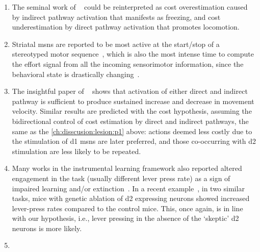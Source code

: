 \begin{enumerate}[noitemsep, label=\roman*.]
    \item \label{ch:disscusion:lesion:p1} The seminal work of \citeauthor{Kravitz2010Nature}~\cite{Kravitz2010Nature} could be reinterpreted as cost overestimation caused by indirect pathway activation that manifests as freezing, and cost underestimation by direct pathway activation that promotes locomotion.
    \item Striatal \glspl{msn} are reported to be most active at the start/stop of a stereotyped motor sequence~\cite{Barnes2005Nature, Jin2014NN}, which is also the most intense time to compute the effort signal from all the incoming sensorimotor information, since the behavioral state is drastically changing~\cite{Sales-Carbonell2018, Robbe2018}.
    \item The insightful paper of ~\cite{Yttri2016Nature} shows that activation of either direct and indirect pathway is sufficient to produce sustained increase and decrease in movement velocity.
    Similar results are predicted with the cost hypothesis, assuming the bidirectional control of cost estimation by direct and indirect pathways, the same as the \autoref{ch:disscusion:lesion:p1} above:
    actions deemed less costly due to the stimulation of \gls{d1} \glspl{msn} are later preferred, and those co-occurring with \gls{d2} stimulation are less likely to be repeated.
    \item Many works in the instrumental learning framework also reported altered engagement in the task (usually different lever press rate) as a sign of impaired learning and/or extinction~\cite[see][for example]{Hart2018CurrBiol}.
    In a recent example~\cite{Matamales2020Sci}, in two similar tasks, mice with genetic ablation of \gls{d2} expressing neurons showed increased lever-press rates compared to the control mice.
    This, once again, is in line with our hypothesis, i.e., lever pressing in the absence of the `skeptic' \gls{d2} neurons is more likely.\footnotemark
    \item %
\end{enumerate}





